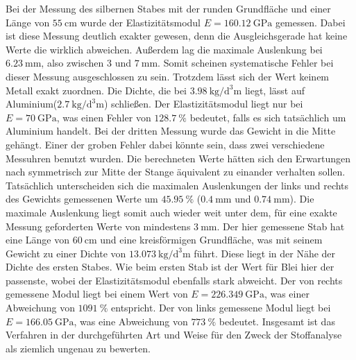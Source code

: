 \noindent Bei der Messung des silbernen Stabes mit der runden Grundfläche und einer Länge von $\SI{55}{\centi\meter}$ wurde der Elastizitätsmodul  $E = \SI{160,12}{\giga\pascal}$ gemessen. Dabei ist diese Messung deutlich exakter gewesen, denn die Ausgleichsgerade hat keine Werte die wirklich abweichen. Außerdem lag die maximale Auslenkung bei $\SI{6,23}{\milli\meter}$, also zwischen $3$ und $\SI{7}{\milli\meter}$. Somit scheinen systematische Fehler bei dieser Messung ausgeschlossen zu sein. Trotzdem lässt sich der Wert keinem Metall exakt zuordnen. Die Dichte, die bei $\SI{3.98}{\kilo\gram\per\cubic\deci\meter}$ liegt, lässt auf Aluminium($\SI{2,7}{\kilo\gram\per\cubic\deci\meter}$) schließen. Der Elastizitätsmodul liegt nur bei $E =\SI{70}{\giga\pascal}$, was einen Fehler von $\SI{128,7}{\percent}$ bedeutet, falls es sich tatsächlich um Aluminium handelt.
\noindent Bei der dritten Messung wurde das Gewicht in die Mitte gehängt. Einer der groben Fehler dabei könnte sein, dass zwei verschiedene Messuhren benutzt wurden. Die berechneten Werte hätten sich den Erwartungen nach symmetrisch zur Mitte der Stange äquivalent zu einander verhalten sollen. Tatsächlich unterscheiden sich die maximalen Auslenkungen der links und rechts des Gewichts gemessenen Werte um $\SI{45,95}{\percent}$ ($\SI{0,4}{\milli\meter}$ und $\SI{0,74}{\milli\meter}$). 
Die maximale Auslenkung liegt somit auch wieder weit unter dem, für eine exakte Messung geforderten Werte von mindestens $\SI{3}{\milli\meter}$. 
Der hier gemessene Stab hat eine Länge von $\SI{60}{\centi\meter}$ und eine kreisförmigen Grundfläche, was mit seinem Gewicht zu einer Dichte von $\SI{13,073}{\kilo\gram\per\cubic\deci\meter}$ führt. Diese liegt in der Nähe der Dichte des ersten Stabes. Wie beim ersten Stab ist der Wert für Blei hier der passenste, wobei der Elastizitätsmodul ebenfalls stark abweicht. 
Der von rechts gemessene Modul liegt bei einem Wert von $E =\SI{226,349}{\giga\pascal}$, was einer Abweichung von $\SI{1091}{\percent}$ entspricht. Der von links gemessene Modul liegt bei $E =\SI{166,05}{\giga\pascal}$, was eine Abweichung von $\SI{773}{\percent}$ bedeutet. 
\noindent Insgesamt ist das Verfahren in der durchgeführten Art und Weise für den Zweck der Stoffanalyse als ziemlich ungenau zu bewerten. 


